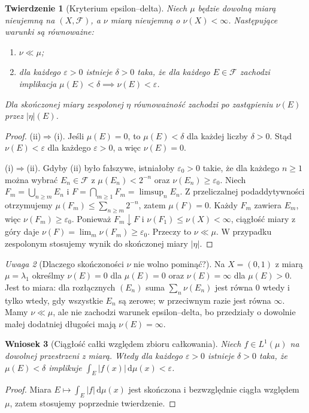 \documentclass[11pt,a4paper,oneside]{book}
\numberwithin{equation}{chapter}
\theoremstyle{plain}
\newtheorem{twierdzenie}{Twierdzenie}[chapter]
\newtheorem{wniosek}[twierdzenie]{Wniosek}
\theoremstyle{definition}
\theoremstyle{remark}
\newtheorem{uwaga}[twierdzenie]{Uwaga}
\begin{document}
\begin{twierdzenie}[Kryterium epsilon--delta]
\label{thm:eps-delta-ac-17}
Niech $\mu$ będzie dowolną miarą nieujemną na $(X,\mathcal F)$,
a $\nu$ miarą nieujemną o $\nu(X)<\infty$.
Następujące warunki są równoważne:
\begin{enumerate}[label=\textup{(\roman*)}]
\item $\nu\ll\mu$;
\item dla każdego $\varepsilon>0$ istnieje $\delta>0$ taka,
że dla każdego $E\in\mathcal F$ zachodzi implikacja
$\mu(E)<\delta\implies\nu(E)<\varepsilon$.
\end{enumerate}
Dla skończonej miary zespolonej $\eta$ równoważność zachodzi po
zastąpieniu $\nu(E)$ przez $|\eta|(E)$.
\end{twierdzenie}
\begin{proof}
(ii)$\Rightarrow$(i). Jeśli $\mu(E)=0$, to
$\mu(E)<\delta$ dla każdej liczby $\delta>0$.
Stąd $\nu(E)<\varepsilon$ dla każdego $\varepsilon>0$,
a więc $\nu(E)=0$.

(i)$\Rightarrow$(ii). Gdyby (ii) było fałszywe, istniałoby
$\varepsilon_0>0$ takie, że dla każdego $n\ge1$
można wybrać $E_n\in\mathcal F$ z
$\mu(E_n)<2^{-n}$ oraz $\nu(E_n)\ge\varepsilon_0$.
Niech $F_m=\bigcup_{n\ge m}E_n$ i
$F=\bigcap_{m\ge1}F_m=\limsup_nE_n$.
Z przeliczalnej podaddytywności otrzymujemy
$\mu(F_m)\le\sum_{n\ge m}2^{-n}$,
zatem $\mu(F)=0$. Każdy $F_m$ zawiera $E_m$, więc
$\nu(F_m)\ge\varepsilon_0$. Ponieważ $F_m\downarrow F$
i $\nu(F_1)\le\nu(X)<\infty$, ciągłość miary z góry daje
$\nu(F)=\lim_m\nu(F_m)\ge\varepsilon_0$.
Przeczy to $\nu\ll\mu$. W przypadku zespolonym
stosujemy wynik do skończonej miary $|\eta|$.
\end{proof}

\begin{uwaga}[Dlaczego skończoności $\nu$ nie wolno pominąć?]
Na $X=(0,1)$ z miarą $\mu=\lambda_1$ określmy
$\nu(E)=0$ dla $\mu(E)=0$ oraz $\nu(E)=\infty$
dla $\mu(E)>0$. Jest to miara: dla rozłącznych
$(E_n)$ suma $\sum_n\nu(E_n)$ jest równa $0$ wtedy
i tylko wtedy, gdy wszystkie $E_n$ są zerowe; w przeciwnym
razie jest równa $\infty$. Mamy $\nu\ll\mu$,
ale nie zachodzi warunek epsilon--delta, bo przedziały
o dowolnie małej dodatniej długości mają $\nu(E)=\infty$.
\end{uwaga}

\begin{wniosek}[Ciągłość całki względem zbioru całkowania]
\label{cor:uniform-abs-cont-int-17}
Niech $f\in L^1(\mu)$ na dowolnej przestrzeni z miarą.
Wtedy dla każdego $\varepsilon>0$ istnieje $\delta>0$ taka,
że $\mu(E)<\delta$ implikuje
$\int_E|f(x)|\,\mathrm d\mu(x)<\varepsilon$.
\end{wniosek}
\begin{proof}
Miara $E\mapsto\int_E|f|\,\mathrm d\mu(x)$ jest skończona
i bezwzględnie ciągła względem $\mu$, zatem stosujemy
poprzednie twierdzenie.
\end{proof}
\end{document}
